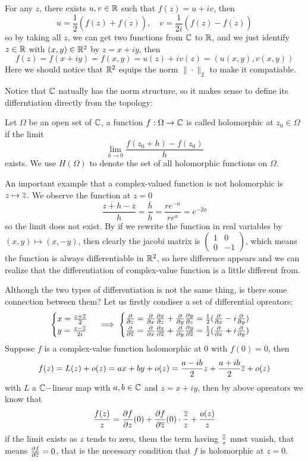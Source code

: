 \documentclass[en,geye,blue,normal,12pt,bibend=bibtex]{elegantnote}
\begin{document}
For any \(z\), there exists \(u,v \in \mathbb{R}\) such that \(f(z) = u+iv\), then
\[u = \frac{1}{2}(f(z) + \overline{f(z)}),\quad v= \frac{1}{2i}(f(z)-\overline{f(z)})\]
so by taking all \(z\), we can get two functions from \(\mathbb{C} \) to \(\mathbb{R}\), and we just identify \(z \in \mathbb{R}\) with \((x,y) \in \mathbb{R}^2\) by \(z = x+iy\), then 
\[f(z) = f(x+iy) = f(x,y) = u(z)+iv(z) = (u(x,y),v(x,y))\]
Here we should notice that \(\mathbb{R}^2\) equips the norm \(\|\cdot\|_2\) to make it compatiable.

Notice that \(\mathbb{C}\) natually has the norm structure, so it makes sense to define its differntiation directly from the topology:
\begin{definition}
    Let \(\Omega\) be an open set of \( \mathbb{C}\), a function \(f: \Omega \to \mathbb{C}\) is called holomorphic at \(z_0 \in \Omega\) if the limit
    \[\lim_{h \rightarrow 0} \frac{f(z_0+h)-f(z_0)}{h}\]
    exists. We use \(H(\Omega)\) to denote the set of all holomorphic functions on \(\Omega\).
\end{definition}

\begin{example}
    An important example that a complex-valued function is not holomorphic is \(z \mapsto \overline{z}\). We observe the function at \(z=0\)
    \[\frac{\overline{z+h}-\overline{z}}{h} = \frac{\overline{h}}{h} = \frac{re^{-a}}{re^a}=e^{-2a}\]
    so the limit does not exist. By if we rewrite the function in real variables by \((x,y) \mapsto (x,-y)\), then clearly the jacobi matrix is \(\begin{pmatrix}
        1 &0 \\
        0 &-1
    \end{pmatrix}\), which means the function is always differentiable in \(\mathbb{R}^2\), so here difference appears and we can realize that the differentiation of complex-value function is a little different from.
\end{example}

Although the two types of differentiation is not the same thing, is there some connection between them? Let us firstly condiser a set of differential opreators:
\[\begin{cases}
    x = \frac{z + \overline{z}}{2} \\
    y = \frac{z - \overline{z}}{2i}
\end{cases} \implies \begin{cases}
    \frac{\partial }{\partial z} = \frac{\partial }{\partial x}\frac{\partial x}{\partial z}+\frac{\partial }{\partial y}\frac{\partial y}{\partial z} = \frac{1}{2}(\frac{\partial }{\partial x}-i \frac{\partial }{\partial y})\\
    \frac{\partial }{\partial \overline{z}} = \frac{\partial }{\partial x}\frac{\partial x}{\partial \overline{z}}+\frac{\partial }{\partial y}\frac{\partial y}{\partial \overline{z}} = \frac{1}{2}(\frac{\partial }{\partial x}+i \frac{\partial }{\partial y})
\end{cases}\]
Suppose \(f\) is a complex-value function holomorphic at \(0\) with \(f(0)= 0\), then
\[f(z) = L(z)+o(z) = ax+by+o(z) = \frac{a-ib}{2}z+\frac{a+ib}{2}\overline{z}+o(z)\]
with \(L\) a \(\mathbb{C}-\)linear map with \(a,b \in \mathbb{C}\) and \(z = x+iy\), then by above opreators we know that
\[\frac{f(z)}{z} = \frac{\partial f}{\partial z}(0)+\frac{\partial f}{\partial \overline{z}}(0)\cdot\frac{\overline{z}}{z}+\frac{o(z)}{z}\]
if the limit exists as \(z\) tends to zero, them the term having \(\frac{\overline{z}}{z}\) must vanish, that means \(\frac{\partial f}{\partial \overline{z}} = 0\), that is the necessary condition that \(f\) is holomorphic at \(z=0\).
\end{document}
